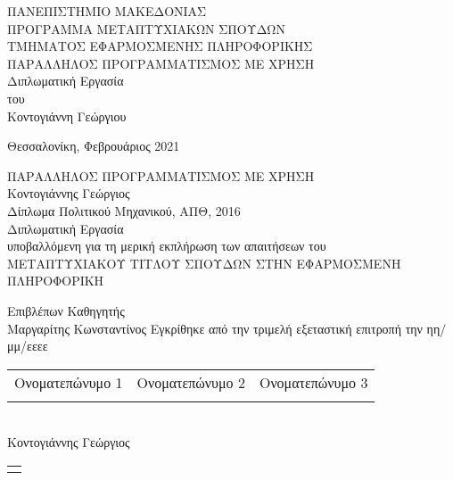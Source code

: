 \begin{center}

\textsc{ ΠΑΝΕΠΙΣΤΗΜΙΟ ΜΑΚΕΔΟΝΙΑΣ\\[0.3 cm]
ΠΡΟΓΡΑΜΜΑ ΜΕΤΑΠΤΥΧΙΑΚΩΝ ΣΠΟΥΔΩΝ\\[0.3 cm]
ΤΜΗΜΑΤΟΣ ΕΦΑΡΜΟΣΜΕΝΗΣ ΠΛΗΡΟΦΟΡΙΚΗΣ}\\[2.5 cm]
{ \large ΠΑΡΑΛΛΗΛΟΣ ΠΡΟΓΡΑΜΜΑΤΙΣΜΟΣ ΜΕ ΧΡΗΣΗ \\[0.4 cm] } Διπλωματική Εργασία\\[1 cm]
του\\[0.5 cm]
\large
Κοντογιάννη Γεώργιου
\begin{minipage}{0.4\textwidth}
\end{minipage}
\vfill
{\large Θεσσαλονίκη, Φεβρουάριος 2021}

 \end{center}
 
\newpage
\mbox{}


\newpage
{}
\setcounter{page}{3} 

 \begin{center}
{\large {ΠΑΡΑΛΛΗΛΟΣ ΠΡΟΓΡΑΜΜΑΤΙΣΜΟΣ ΜΕ ΧΡΗΣΗ }}\\[2 cm]
Κοντογιάννης Γεώργιος\\[0.5 cm]
Δίπλωμα Πολιτικού Μηχανικού, ΑΠΘ, 2016\\[2 cm]
Διπλωματική Εργασία\\[0.5 cm]
υποβαλλόμενη για τη μερική εκπλήρωση των απαιτήσεων του\\[0.5 cm]
ΜΕΤΑΠΤΥΧΙΑΚΟΥ ΤΙΤΛΟΥ ΣΠΟΥΔΩΝ ΣΤΗΝ ΕΦΑΡΜΟΣΜΕΝΗ ΠΛΗΡΟΦΟΡΙΚΗ\\[2 cm]
\begin{flushleft}
Επιβλέπων Καθηγητής\\
Μαργαρίτης Κωνσταντίνος
\vfill
Εγκρίθηκε από την τριμελή εξεταστική επιτροπή την ηη/μμ/εεεε\\[0.5 cm]
\begin{tabular}{  p{} 
                   p{} p{}
                   } Ονοματεπώνυμο 1 & Ονοματεπώνυμο 2  & Ονοματεπώνυμο 3 \\[1 cm]
\dotfill & \dotfill  & \dotfill \\
\end{tabular}\\[2 cm]
Κοντογιάννης Γεώργιος \\[0.5 cm]
\begin{tabular}{  p{}   }
\dotfill
\end{tabular}\\[1 cm]
\end{flushleft}
\end{center}
  
